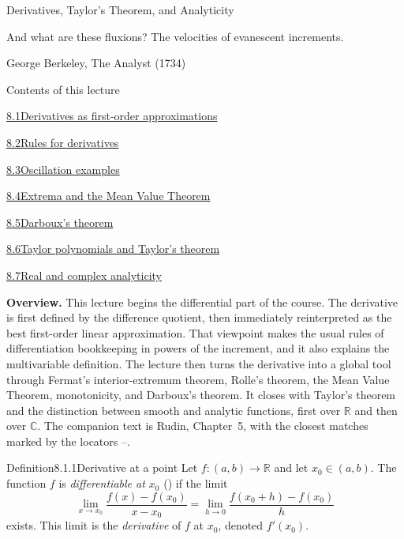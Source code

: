 \documentclass[main.tex]{subfiles}
\begin{document}
%
  {Derivatives, Taylor's Theorem, and Analyticity}

\epigraph{And what are these fluxions? The velocities of evanescent increments.}
{George Berkeley, The Analyst (1734)}

\begin{lecturecontents}{Contents of this lecture}
  \item \hyperlink{8.1}{8.1\quad Derivatives as first-order approximations}
  \item \hyperlink{8.2}{8.2\quad Rules for derivatives}
  \item \hyperlink{8.3}{8.3\quad Oscillation examples}
  \item \hyperlink{8.4}{8.4\quad Extrema and the Mean Value Theorem}
  \item \hyperlink{8.5}{8.5\quad Darboux's theorem}
  \item \hyperlink{8.6}{8.6\quad Taylor polynomials and Taylor's theorem}
  \item \hyperlink{8.7}{8.7\quad Real and complex analyticity}
\end{lecturecontents}

\bigskip
\noindent\textbf{Overview.} This lecture begins the differential part of the course. The
derivative is first defined by the difference quotient, then immediately reinterpreted as the
best first-order linear approximation. That viewpoint makes the usual rules of differentiation
bookkeeping in powers of the increment, and it also explains the multivariable definition.
The lecture then turns the derivative into a global tool through Fermat's interior-extremum
theorem, Rolle's theorem, the Mean Value Theorem, monotonicity, and Darboux's theorem. It closes
with Taylor's theorem and the distinction between smooth and analytic functions, first over
$\mathbb R$ and then over $\mathbb C$. The companion text is Rudin, Chapter~5, with the
closest matches marked by the locators --.

\clearpage

\begin{Obj}{Definition}{8.1.1}{Derivative at a point}
Let $f:(a,b)\to\mathbb R$ and let $x_0\in(a,b)$. The function $f$ is
\emph{differentiable at $x_0$} () if the limit
\[
  \lim_{x\to x_0}\frac{f(x)-f(x_0)}{x-x_0}
  =
  \lim_{h\to0}\frac{f(x_0+h)-f(x_0)}{h}
\]
exists. This limit is the \emph{derivative} of $f$ at $x_0$, denoted $f'(x_0)$.
\end{Obj}
\end{document}
